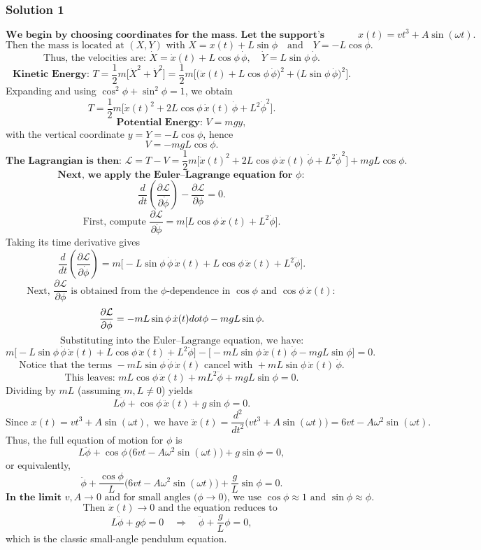 \documentclass{article}
\begin{document}
\subsubsection{Solution 1}
\[
\textbf{We begin by choosing coordinates for the mass. Let the support’s horizontal position be } x(t)=vt^3+A\sin(\omega t).
\]
\[
\text{Then the mass is located at } (X,Y) \text{ with } X=x(t)+L\sin\phi \quad \text{and} \quad Y=-L\cos\phi.
\]
\[
\text{Thus, the velocities are: } \dot{X}=\dot{x}(t)+L\cos\phi\,\dot{\phi}, \quad \dot{Y}=L\sin\phi\,\dot{\phi}.
\]
\[
\textbf{Kinetic Energy: } T=\frac{1}{2}m\Big[\dot{X}^2+\dot{Y}^2\Big]=\frac{1}{2}m\Big[\big(\dot{x}(t)+L\cos\phi\,\dot{\phi}\big)^2+\big(L\sin\phi\,\dot{\phi}\big)^2\Big].
\]
Expanding and using \(\cos^2\phi+\sin^2\phi=1\), we obtain
\[
T=\frac{1}{2}m\Big[\dot{x}(t)^2+2L\cos\phi\,\dot{x}(t)\,\dot{\phi}+L^2\dot{\phi}^2\Big].
\]
\[
\textbf{Potential Energy: } V=mgy,
\]
with the vertical coordinate \(y=Y=-L\cos\phi\), hence
\[
V=-mgL\cos\phi.
\]
\[
\textbf{The Lagrangian is then: } \mathcal{L}=T-V=\frac{1}{2}m\Big[\dot{x}(t)^2+2L\cos\phi\,\dot{x}(t)\,\dot{\phi}+L^2\dot{\phi}^2\Big]+mgL\cos\phi.
\]
\[
\textbf{Next, we apply the Euler–Lagrange equation for } \phi:
\]
\[
\frac{d}{dt}\left(\frac{\partial\mathcal{L}}{\partial\dot{\phi}}\right)-\frac{\partial\mathcal{L}}{\partial\phi}=0.
\]
\[
\text{First, compute } \frac{\partial\mathcal{L}}{\partial\dot{\phi}}=m\Big[L\cos\phi\,\dot{x}(t)+L^2\dot{\phi}\Big].
\]
Taking its time derivative gives
\[
\frac{d}{dt}\left(\frac{\partial\mathcal{L}}{\partial\dot{\phi}}\right)=m\Big[-L\sin\phi\,\dot{\phi}\,\dot{x}(t)+L\cos\phi\,\ddot{x}(t)+L^2\ddot{\phi}\Big].
\]
\[
\text{Next, } \frac{\partial\mathcal{L}}{\partial\phi} \text{ is obtained from the } \phi\text{-dependence in } \cos\phi \text{ and } \cos\phi\,\dot{x}(t):
\]
\[
\frac{\partial\mathcal{L}}{\partial\phi}=-mL\sin\phi\,\dot{x}(t)\,\\dot{\phi}-mgL\sin\phi.
\]
\[
\text{Substituting into the Euler–Lagrange equation, we have:}
\]
\[
m\Big[-L\sin\phi\,\dot{\phi}\,\dot{x}(t)+L\cos\phi\,\ddot{x}(t)+L^2\ddot{\phi}\Big] -\Big[-mL\sin\phi\,\dot{x}(t)\,\dot{\phi}-mgL\sin\phi\Big]=0.
\]
\[
\text{Notice that the terms } -mL\sin\phi\,\dot{\phi}\,\dot{x}(t) \text{ cancel with } +mL\sin\phi\,\dot{x}(t)\,\dot{\phi}.
\]
\[
\text{This leaves: } mL\cos\phi\,\ddot{x}(t)+mL^2\ddot{\phi}+mgL\sin\phi=0.
\]
Dividing by \(mL\) (assuming \(m,L\neq 0\)) yields
\[
L\ddot{\phi}+\cos\phi\,\ddot{x}(t)+g\sin\phi=0.
\]
\[
\text{Since } x(t)=vt^3+A\sin(\omega t), \text{ we have } \ddot{x}(t)=\frac{d^2}{dt^2}\big(vt^3+A\sin(\omega t)\big)=6vt-A\omega^2\sin(\omega t).
\]
Thus, the full equation of motion for \(\phi\) is
\[
L\ddot{\phi}+\cos\phi\,\Big(6vt-A\omega^2\sin(\omega t)\Big)+g\sin\phi=0,
\]
or equivalently,
\[
\ddot{\phi}+\frac{\cos\phi}{L}\Big(6vt-A\omega^2\sin(\omega t)\Big)+\frac{g}{L}\sin\phi=0.
\]
\[
\textbf{In the limit } v,A\to0 \text{ and for small angles (}\phi\to0\text{), we use } \cos\phi\approx1 \text{ and } \sin\phi\approx\phi.
\]
\[
\text{Then } \ddot{x}(t)\to 0 \text{ and the equation reduces to }
\]
\[
L\ddot{\phi}+g\phi=0 \quad \Longrightarrow \quad \ddot{\phi}+\frac{g}{L}\phi=0,
\]
which is the classic small-angle pendulum equation.
\end{document}
